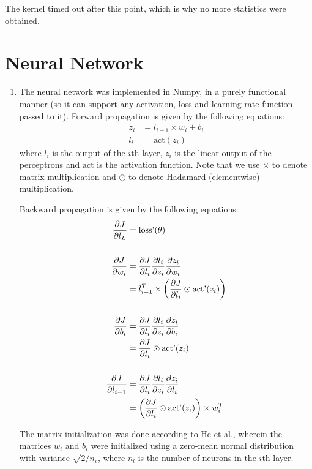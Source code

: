 \documentclass[12pt]{article}
\begin{document}
The kernel timed out after this point, which is why no more statistics were 
obtained.

\pagebreak

\section{Neural Network}

\begin{enumerate}[label=(\alph*)]
    \item The neural network was implemented in Numpy, in a purely functional 
    manner (so it can support any activation, loss and learning rate function 
    passed to it). Forward propagation is given by the following equations:
    \begin{align*}
        z_i &= l_{i-1} \times w_i + b_i \\
        l_i &= \text{act}(z_i)
    \end{align*}
    where $l_i$ is the output of the $i$th layer, $z_i$ is the linear output 
    of the perceptrons and $\text{act}$ is the activation function. Note that we 
    use $\times$ to denote matrix multiplication and $\odot$ to denote Hadamard
    (elementwise) multiplication.

    Backward propagation is given by the following equations:
    \begin{align*}
        \pdv{J}{l_L} &= \text{loss'}(\theta) \\
        \\
        \pdv{J}{w_i} &= \pdv{J}{l_i} \pdv{l_i}{z_i} \pdv{z_i}{w_i} \\
                     &= l_{i-1}^T \times \left( \pdv{J}{l_i} \odot \text{act'}(z_i) \right) \\
        \\
        \pdv{J}{b_i} &= \pdv{J}{l_i} \pdv{l_i}{z_i} \pdv{z_i}{b_i} \\
                     &= \pdv{J}{l_i} \odot \text{act'}(z_i) \\
        \\
        \pdv{J}{l_{i-1}} &= \pdv{J}{l_i} \pdv{l_i}{z_i} \pdv{z_i}{l_i} \\
                     &= \left( \pdv{J}{l_i} \odot \text{act'}(z_i) \right) \times w_i^T 
    \end{align*}

    The matrix initialization was done according to \href{https://arxiv.org/pdf/1502.01852.pdf}{He et al.},
    wherein the matrices $w_i$ and $b_i$ were initialized using a zero-mean 
    normal distribution with variance $\sqrt{2/n_i}$, where $n_l$ is the number 
    of neurons in the $i$th layer.


\end{enumerate}
\end{document}
